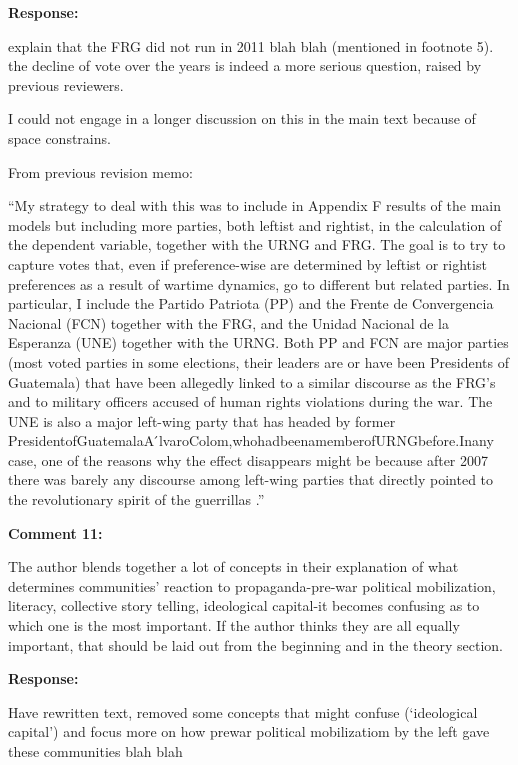 \documentclass[12pt, a4paper, notitlepage]{article}
\begin{document}
\noindent\textbf{Response:}

explain that the FRG did not run in 2011 blah blah (mentioned in footnote 5).
the decline of vote over the years is indeed a more serious question, raised by previous reviewers.

I could not engage in a longer discussion on this in the main text because of space constrains.

From previous revision memo:

``My strategy to deal with this was to include in Appendix F results of the main models but including more parties, both leftist and rightist, in the calculation of the dependent variable, together with the URNG and FRG. The goal is to try to capture votes that, even if preference-wise are determined by leftist or rightist preferences as a result of wartime dynamics, go to different but related parties. In particular, I include the Partido Patriota (PP) and the Frente de Convergencia Nacional (FCN) together with the FRG, and the Unidad Nacional de la Esperanza (UNE) together with the URNG. Both PP and FCN are major parties (most voted parties in some elections, their leaders are or have been Presidents of Guatemala) that have been allegedly linked to a similar discourse as the FRG’s and to military officers accused of human rights violations during the war. The UNE is also a major left-wing party that has headed by former PresidentofGuatemalaA ́lvaroColom,whohadbeenamemberofURNGbefore.Inany case, one of the reasons why the effect disappears might be because after 2007 there was barely any discourse among left-wing parties that directly pointed to the revolutionary spirit of the guerrillas \citep{Ibarra:2008to}.''

\vspace{15pt}
\noindent\textbf{Comment 11:}
\begin{displayquote}
The author blends together a lot of concepts in their explanation of what determines communities' reaction to propaganda-pre-war political mobilization, literacy, collective story telling, ideological capital-it becomes confusing as to which one is the most important. If the author thinks they are all equally important, that should be laid out from the beginning and in the theory section.
\end{displayquote}

\noindent\textbf{Response:}

Have rewritten text, removed some concepts that might confuse (`ideological capital') and focus more on how prewar political mobilizatiom by the left gave these communities blah blah
\end{document}
